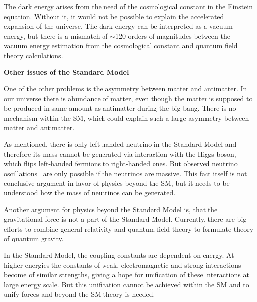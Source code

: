 The dark energy arises from the need of the cosmological constant in the Einstein equation. Without it, it would not be possible to explain the accelerated expansion of the universe. The dark energy can be interpreted as a vacuum energy, but there is a mismatch of $\sim$120 orders of magnitudes between the vacuum energy estimation from the cosmological constant and quantum field theory calculations.



\textbf{Other issues of the Standard Model}

One of the other problems is the asymmetry between matter and antimatter. In our universe there is abundance of matter, even though the matter is supposed to be produced in same amount as antimatter during the big bang. There is no mechanism within the SM, which could explain such a large asymmetry between matter and antimatter.

As mentioned, there is only left-handed neutrino in the Standard Model and therefore its mass cannot be generated via interaction with the Higgs boson, which flips left-handed fermions to right-handed ones. But observed neutrino oscillations~\cite{Fukuda:1998mi, Ahmad:2001an} are only possible if the neutrinos are massive. This fact itself is not conclusive argument in favor of physics beyond the SM, but it needs to be understood how the mass of neutrinos can be generated.

Another argument for physics beyond the Standard Model is, that the gravitational force is not a part of the Standard Model. Currently, there are big efforts to combine general relativity and quantum field theory to formulate theory of quantum gravity.  

In the Standard Model, the coupling constants are dependent on energy. At higher energies the constants of weak, electromagnetic and strong interactions become of similar strengths, giving a hope for unification of these interactions at large energy scale. But this unification cannot be achieved within the SM and to unify forces and beyond the SM theory is needed.
 
